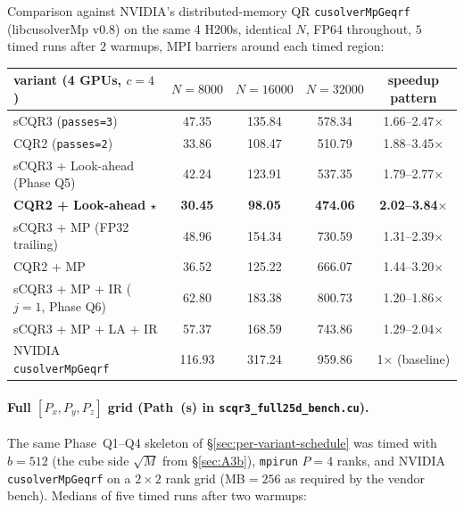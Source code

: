 \documentclass[11pt]{article}
\begin{document}
Comparison against NVIDIA's distributed-memory QR \texttt{cusolverMpGeqrf}
(libcusolverMp v0.8) on the same 4 H200s, identical $N$, FP64 throughout,
$5$ timed runs after $2$ warmups, MPI barriers around each
timed region:

\begin{center}
\renewcommand{\arraystretch}{1.05}
\begin{tabular}{l ccc | c}
\toprule
variant (4 GPUs, $c{=}4$) & $N{=}8000$ & $N{=}16000$ & $N{=}32000$ & speedup pattern \\
\midrule
sCQR3 (\texttt{passes=3})          & 47.35  & 135.84 & 578.34 & 1.66--2.47$\times$ \\
CQR2 (\texttt{passes=2})           & 33.86  & 108.47 & 510.79 & 1.88--3.45$\times$ \\
sCQR3 + Look-ahead (Phase Q5)      & 42.24  & 123.91 & 537.35 & 1.79--2.77$\times$ \\
\textbf{CQR2 + Look-ahead $\star$} & \textbf{30.45} & \textbf{98.05} & \textbf{474.06} & \textbf{2.02--3.84}$\times$ \\
sCQR3 + MP (FP32 trailing)         & 48.96  & 154.34 & 730.59 & 1.31--2.39$\times$ \\
CQR2 + MP                          & 36.52  & 125.22 & 666.07 & 1.44--3.20$\times$ \\
sCQR3 + MP + IR ($j{=}1$, Phase Q6)& 62.80  & 183.38 & 800.73 & 1.20--1.86$\times$ \\
sCQR3 + MP + LA + IR               & 57.37  & 168.59 & 743.86 & 1.29--2.04$\times$ \\
\midrule
NVIDIA \texttt{cusolverMpGeqrf}    & 116.93 & 317.24 & 959.86 & 1$\times$ (baseline) \\
\bottomrule
\end{tabular}
\end{center}

\paragraph{Full $[P_x,P_y,P_z]$ grid (Path~(s) in \texttt{scqr3\_full25d\_bench.cu}).}
The same Phase~Q1--Q4 skeleton of \S\ref{sec:per-variant-schedule} was
timed with $b = 512$ (the cube side $\sqrt{M}$ from \S\ref{sec:A3b}),
\texttt{mpirun} $P{=}4$ ranks, and NVIDIA \texttt{cusolverMpGeqrf} on a
$2{\times}2$ rank grid (MB${=}256$ as required by the vendor bench).
Medians of five timed runs after two warmups:
\end{document}
